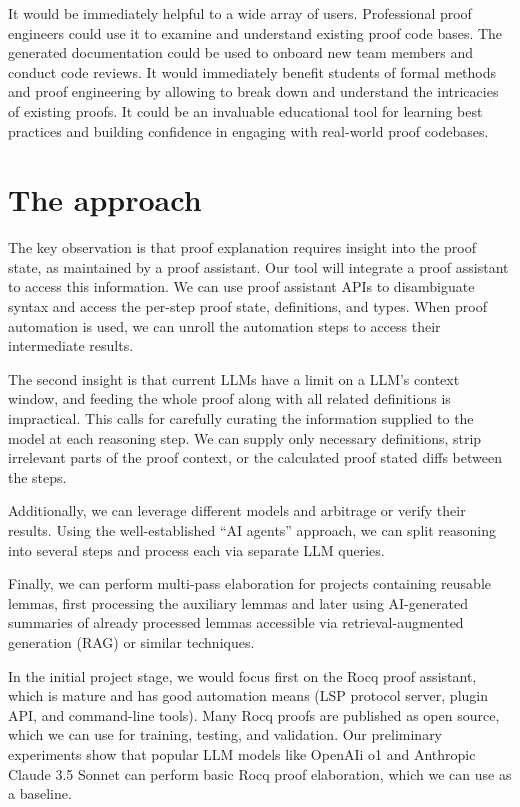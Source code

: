 \documentclass[letterpaper]{article}
\begin{document}
It would be immediately helpful to a wide array of users. Professional
proof engineers could use it to examine and understand existing proof
code bases. The generated documentation could be used to onboard new
team members and conduct code reviews. It would immediately benefit
students of formal methods and proof engineering by allowing to break
down and understand the intricacies of existing proofs. It could be an
invaluable educational tool for learning best practices and building
confidence in engaging with real-world proof codebases.

\section*{The approach}

The key observation is that proof explanation requires insight into
the proof state, as maintained by a proof assistant. Our tool will
integrate a proof assistant to access this information. We can use
proof assistant APIs to disambiguate syntax and access the per-step
proof state, definitions, and types. When proof automation is used, we
can unroll the automation steps to access their intermediate results.

The second insight is that current LLMs have a limit on a LLM’s
context window, and feeding the whole proof along with all related
definitions is impractical. This calls for carefully curating the
information supplied to the model at each reasoning step. We can
supply only necessary definitions, strip irrelevant parts of the proof
context, or the calculated proof stated diffs between the steps.

Additionally, we can leverage different models and arbitrage or verify
their results. Using the well-established “AI agents” approach, we can
split reasoning into several steps and process each via separate LLM
queries.

Finally, we can perform multi-pass elaboration for projects containing
reusable lemmas, first processing the auxiliary lemmas and later using
AI-generated summaries of already processed lemmas accessible via
retrieval-augmented generation (RAG) or similar techniques.

In the initial project stage, we would focus first on the Rocq proof
assistant, which is mature and has good automation means (LSP protocol
server, plugin API, and command-line tools). Many Rocq proofs are
published as open source, which we can use for training, testing, and
validation. Our preliminary experiments show that popular LLM models
like OpenAIi o1 and Anthropic Claude 3.5 Sonnet can perform basic Rocq
proof elaboration, which we can use as a baseline.
\end{document}
